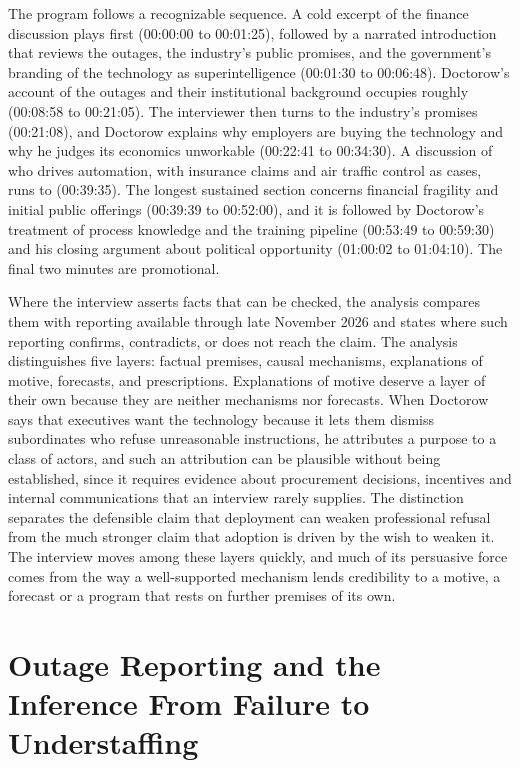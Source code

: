 \documentclass[12pt]{article}
\newcommand{\ts}[1]{(#1)}
\begin{document}
The program follows a recognizable sequence. A cold excerpt of the finance discussion plays first \ts{00:00:00 to 00:01:25}, followed by a narrated introduction that reviews the outages, the industry's public promises, and the government's branding of the technology as superintelligence \ts{00:01:30 to 00:06:48}. Doctorow's account of the outages and their institutional background occupies roughly \ts{00:08:58 to 00:21:05}. The interviewer then turns to the industry's promises \ts{00:21:08}, and Doctorow explains why employers are buying the technology and why he judges its economics unworkable \ts{00:22:41 to 00:34:30}. A discussion of who drives automation, with insurance claims and air traffic control as cases, runs to \ts{00:39:35}. The longest sustained section concerns financial fragility and initial public offerings \ts{00:39:39 to 00:52:00}, and it is followed by Doctorow's treatment of process knowledge and the training pipeline \ts{00:53:49 to 00:59:30} and his closing argument about political opportunity \ts{01:00:02 to 01:04:10}. The final two minutes are promotional.

Where the interview asserts facts that can be checked, the analysis compares them with reporting available through late November 2026 and states where such reporting confirms, contradicts, or does not reach the claim. The analysis distinguishes five layers: factual premises, causal mechanisms, explanations of motive, forecasts, and prescriptions. Explanations of motive deserve a layer of their own because they are neither mechanisms nor forecasts. When Doctorow says that executives want the technology because it lets them dismiss subordinates who refuse unreasonable instructions, he attributes a purpose to a class of actors, and such an attribution can be plausible without being established, since it requires evidence about procurement decisions, incentives and internal communications that an interview rarely supplies. The distinction separates the defensible claim that deployment can weaken professional refusal from the much stronger claim that adoption is driven by the wish to weaken it. The interview moves among these layers quickly, and much of its persuasive force comes from the way a well-supported mechanism lends credibility to a motive, a forecast or a program that rests on further premises of its own.

\section{Outage Reporting and the Inference From Failure to Understaffing}
\end{document}

